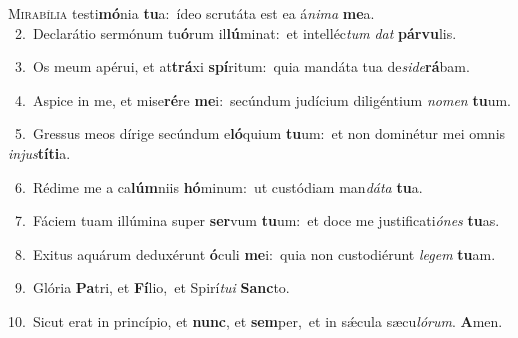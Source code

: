 \lettrine{\initial\textcolor{\initialcolor}{M}}{irabília} testi\-\textbf{mó}\-nia \textbf{tu}\-a:~\star ídeo scrutáta est ea á\-\textit{ni}\-\textit{ma} \textbf{me}\-a.\\
{\numbfont\textcolor{\numbcolor}{~2.}}~Declarátio sermónum tu\-\textbf{ó}\-rum il\-\textbf{lú}\-minat:~\star et intelléc\textit{tum} \textit{dat} \textbf{pár}\-\textbf{vu}lis.\par
{\numbfont\textcolor{\numbcolor}{~3.}}~Os meum apérui, et at\-\textbf{trá}\-xi \textbf{spí}\-ritum:~\star quia mandáta tua de\-\textit{si}\-\textit{de}\textbf{rá}bam.\par
{\numbfont\textcolor{\numbcolor}{~4.}}~Aspice in me, et mise\-\textbf{ré}\-re \textbf{me}\-i:~\star secúndum judícium diligéntium \textit{no}\-\textit{men} \textbf{tu}\-um.\par
{\numbfont\textcolor{\numbcolor}{~5.}}~Gressus meos dírige secúndum e\-\textbf{ló}\-quium \textbf{tu}\-um:~\star et non dominétur mei omnis \textit{in}\-\textit{jus}\textbf{tí}\textbf{ti}a.\par
{\numbfont\textcolor{\numbcolor}{~6.}}~Rédime me a ca\-\textbf{lúm}\-niis \textbf{hó}\-minum:~\star ut custódiam man\-\textit{dá}\-\textit{ta} \textbf{tu}\-a.\par
{\numbfont\textcolor{\numbcolor}{~7.}}~Fáciem tuam illúmina super \textbf{ser}\-vum \textbf{tu}\-um:~\star et doce me justificati\-\textit{ó}\-\textit{nes} \textbf{tu}\-as.\par
{\numbfont\textcolor{\numbcolor}{~8.}}~Exitus aquárum deduxérunt \textbf{ó}\-culi \textbf{me}\-i:~\star quia non custodiérunt \textit{le}\-\textit{gem} \textbf{tu}\-am.\par
{\numbfont\textcolor{\numbcolor}{~9.}}~Glória \textbf{Pa}\-tri, et \textbf{Fí}\-lio,~\star et Spirí\-\textit{tu}\-\textit{i} \textbf{Sanc}\-to.\par
{\numbfont\textcolor{\numbcolor}{10.}}~Sicut erat in princípio, et \textbf{nunc}\-, et \textbf{sem}\-per,~\star et in sǽcula sæcu\-\textit{ló}\-\textit{rum}. \textbf{A}\-men.\par

